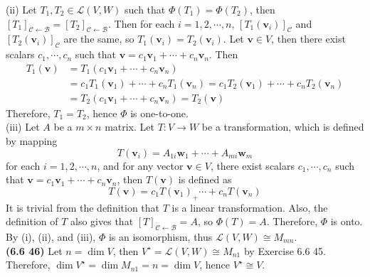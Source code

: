 (ii) Let $T_1, T_2 \in \mathscr{L}(V, W)$ such that $\Phi(T_1) = \Phi(T_2)$, then $[T_1]_{ \mathcal{C} \leftarrow \mathcal{B} } = [T_2]_{ \mathcal{C} \leftarrow \mathcal{B} }$. Then for each $i = 1, 2, \cdots, n$, $[T_1(\textbf{v}_i)]_\mathcal{C}$ and $[T_2(\textbf{v}_i)]_\mathcal{C}$ are the same, so $T_1(\textbf{v}_i) = T_2(\textbf{v}_i)$. Let $\textbf{v} \in V$, then there exist scalars $c_1, \cdots, c_n$ such that $\textbf{v} = c_1\textbf{v}_1 + \cdots + c_n\textbf{v}_n$. Then \begin{align*}
	T_1(\textbf{v}) &= T_1(c_1\textbf{v}_1 + \cdots + c_n\textbf{v}_n) \\
	&= c_1T_1(\textbf{v}_1) + \cdots + c_nT_1(\textbf{v}_n) = c_1T_2(\textbf{v}_1) + \cdots + c_nT_2(\textbf{v}_n) \\
	&= T_2(c_1\textbf{v}_1 + \cdots + c_n\textbf{v}_n) = T_2(\textbf{v})
\end{align*} Therefore, $T_1 = T_2$, hence $\Phi$ is one-to-one. \\

(iii) Let $A$ be a $m \times n$ matrix. Let $T: V \rightarrow W$ be a transformation, which is defined by mapping \begin{equation*}
	T(\textbf{v}_i) = A_{1i}\textbf{w}_1 + \cdots + A_{mi}\textbf{w}_m
\end{equation*} for each $i = 1, 2, \cdots, n$, and for any vector $\textbf{v} \in V$, there exist scalars $c_1, \cdots, c_n$ such that $\textbf{v} = c_1\textbf{v}_1 + \cdots + c_n\textbf{v}_n$, then $T(\textbf{v})$ is defined as \begin{equation*}
	T(\textbf{v}) = c_1T(\textbf{v}_1) _+ \cdots + c_nT(\textbf{v}_n)
\end{equation*}
It is trivial from the definition that $T$ is a linear transformation. Also, the definition of $T$ also gives that $[T]_{ \mathcal{C} \leftarrow \mathcal{B} } = A$,  so $\Phi(T) = A$. Therefore, $\Phi$ is onto. \\

By (i), (ii), and (iii), $\Phi$ is an isomorphism, thus $\mathscr{L}(V, W) \cong M_{mn}$. \\

\textbf{(6.6 46)}
Let $n = \dim V$, then $V^\star = \mathscr{L}(V, W) \cong M_{n1}$ by Exercise 6.6 45. Therefore, $\dim V^\star = \dim M_{n1} = n = \dim V$, hence $V^\star \cong V$.
\fi